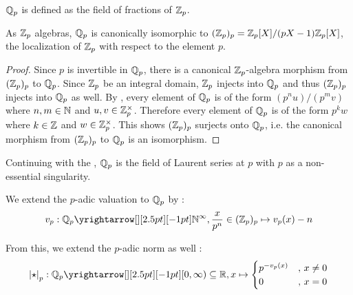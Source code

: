 \begin{dfn}
  
  $\Q_p$ is defined as the field of fractions of $\Z_p$. 
\end{dfn}

\begin{prop}[$\Q_p$ as Localizing $\Z_p$ at $p$]
  
  As $\Z_p$ algebras,
  $\Q_p$ is canonically isomorphic to $(\mathbb{Z}_p)_p = \mathbb{Z}_p[X]/(pX-1)\mathbb{Z}_p[X]$,
  the localization of $\Z_p$ with respect to the element $p$. 
\end{prop}
\begin{proof}
  Since $p$ is invertible in $\Q_p$, 
  there is a canonical $\Z_p$-algebra morphism from $(\mathbb{Z}_p)_p$ to $\Q_p$.
  Since $\Z_p$ be an integral domain, 
  $\Z_p$ injects into $\Q_p$ and thus $(\mathbb{Z}_p)_p$ injects into $\Q_p$ as well.
  By ,
  every element of $\Q_p$ is of the form $(p^nu)/(p^m v)$ where 
  $n, m \in \mathbb{N}$ and $u, v \in \mathbb{Z}_p^\times$. 
  Therefore every element of $\Q_p$ is of the form $p^k w$
  where $k \in \mathbb{Z}$ and $w \in \mathbb{Z}_p^\times$. 
  This shows $(\mathbb{Z}_p)_p$ surjects onto $\Q_p$,
  i.e. the canonical morphism from $(\mathbb{Z}_p)_p$ to $\Q_p$ is an isomorphism.
\end{proof}

\begin{rmk}[Meaning of $\Q_p$]
  
  Continuing with the , 
  $\Q_p$ is the field of Laurent series at $p$ 
  with $p$ as a non-essential singularity.
\end{rmk}

\begin{dfn}
  
  We extend the $p$-adic valuation to $\Q_p$ by : 
  \begin{align*}
    v_p : \map{\Q_p}{\N^\infty}{}{}, 
    \frac{x}{p^n} \in (\Z_p)_p \mapsto v_p(x) - n
  \end{align*}

  From this, we extend the $p$-adic norm as well : 
  \begin{align*}
    \abs{\star}_p : \map{\Q_p}{[0,\infty)\subs \R}{}{}, 
    x \mapsto \begin{cases}
      p^{-v_p(x)} &,\, x \neq 0 \\
      0 &,\, x = 0
    \end{cases}
  \end{align*}
\end{dfn}

